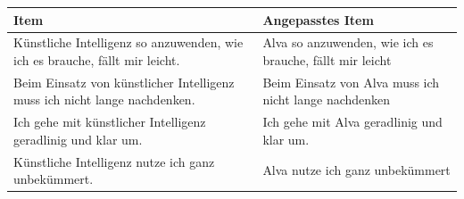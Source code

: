 \begin{center}
\begin{threeparttable}
\caption{Items für Konstrukt: EOU}
\label{tab:EOU}
\begin{tabularx}{\textwidth}{X X}
\toprule
\textbf{Item} & \textbf{Angepasstes Item} \\
\midrule
Künstliche Intelligenz so anzuwenden, wie ich es brauche, fällt mir leicht. & Alva so anzuwenden, wie ich es brauche, fällt mir leicht \\
Beim Einsatz von künstlicher Intelligenz muss ich nicht lange nachdenken. & Beim Einsatz von Alva muss ich nicht lange nachdenken \\
Ich gehe mit künstlicher Intelligenz geradlinig und klar um. & Ich gehe mit Alva geradlinig und klar um. \\
Künstliche Intelligenz nutze ich ganz unbekümmert. & Alva nutze ich ganz unbekümmert \\
\bottomrule
\end{tabularx}
\end{threeparttable}
\end{center}
\vspace{1em}